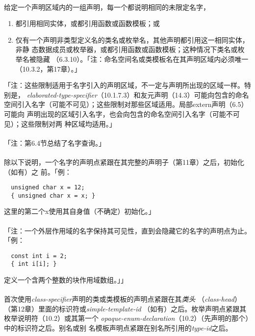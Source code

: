 \paragraph{}
给定一个声明区域内的一组声明，每一个都说明相同的未限定名字，
\begin{enumerate}
  \item{都引用相同实体，或都引用函数或函数模板；或}
  \item{仅有一个声明非类型定义名的类名或枚举名，其他声明都引用这一相同实体，非静
    态数据成员或枚举器，或都引用函数或函数模板；这种情况下类名或枚举名被隐藏
  （6.3.10）。「注：命名空间名或类模板名在其声明区域内必须唯一
  （10.3.2，第17章）。」}
\end{enumerate}
「注：这些限制适用于名字引入的声明区域，不一定与声明所出现的区域一样。特别是，
\textit{elaborated-type-specifier}（10.1.7.3）和友元声明（14.3）可能向包含的命名
空间引入名字（可能不可见）；这些限制对那些区域适用。局部extern声明（6.5）可能向
声明出现的区域引入名字，也会向包含的命名空间引入名字（可能不可见）；这些限制对两
种区域均适用。」

\paragraph{}
「注：第6.4节总结了名字查询。」


\paragraph{}
除以下说明，一个名字的声明点紧跟在其完整的声明子（第11章）之后，初始化（如有）之
前。「例：
\begin{lstlisting}
  unsigned char x = 12;
  { unsigned char x = x; }
\end{lstlisting}
这里的第二个x使用其自身值（不确定）初始化。」

\paragraph{}
「注：一个外层作用域的名字保持其可见性，直到会隐藏它的名字的声明点为止。
「例：
\begin{lstlisting}
  const int i = 2;
  { int i[i]; }
\end{lstlisting}
定义一个含两个整数的块作用域数组。」」


\paragraph{}
首次使用\textit{class-specifier}声明的类或类模板的声明点紧跟在其\textit{类头}
（\textit{class-head}）（第12章）里面的标识符或\textit{simple-template-id}
（如有）之后。枚举声明点紧跟其枚举说明符（10.2）或其第一个
\textit{opaque-enum-declaration}（10.2）（先声明的那个）中的标识符之后。别名或别
名模板声明点紧跟在别名所引用的\textit{type-id}之后。

